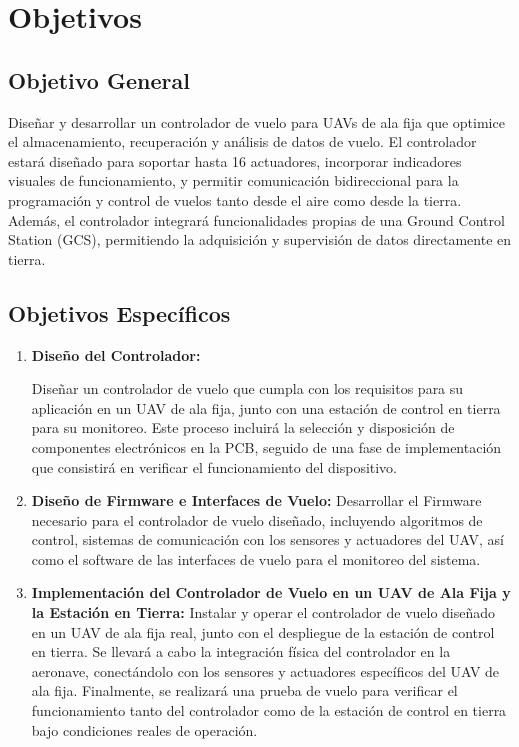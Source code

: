 \section{Objetivos}

\subsection{Objetivo General}


Diseñar y desarrollar un controlador de vuelo para UAVs de ala fija que optimice el almacenamiento, recuperación y análisis de datos de vuelo. El controlador estará diseñado para soportar hasta 16 actuadores, incorporar indicadores visuales de funcionamiento, y permitir comunicación bidireccional para la programación y control de vuelos tanto desde el aire como desde la tierra. Además, el controlador integrará funcionalidades propias de una Ground Control Station (GCS), permitiendo la adquisición y supervisión de datos directamente en tierra.


\subsection{Objetivos Específicos}

\begin{enumerate}


\item \textbf{Diseño del Controlador:}

Diseñar un controlador de vuelo que cumpla con los requisitos para su aplicación en un UAV de ala fija, junto con una estación de control en tierra para su monitoreo. Este proceso incluirá la selección y disposición de componentes electrónicos en la PCB, seguido de una fase de implementación que consistirá en verificar el funcionamiento del dispositivo.
\\
\item \textbf{Diseño de Firmware e Interfaces de Vuelo:}
    Desarrollar el Firmware necesario para el controlador de vuelo diseñado, incluyendo algoritmos de control, sistemas de comunicación con los sensores y actuadores del UAV, así como el software de las interfaces de vuelo para el monitoreo del sistema.
\\

\item \textbf{Implementación del Controlador de Vuelo en un UAV de Ala Fija y la Estación en Tierra:}
Instalar y operar el controlador de vuelo diseñado en un UAV de ala fija real, junto con el despliegue de la estación de control en tierra. Se llevará a cabo la integración física del controlador en la aeronave, conectándolo con los sensores y actuadores específicos del UAV de ala fija. Finalmente, se realizará una prueba de vuelo para verificar el funcionamiento tanto del controlador como de la estación de control en tierra bajo condiciones reales de operación.

\end{enumerate}